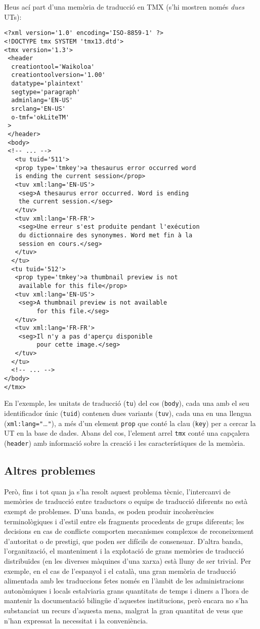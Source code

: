 Heus ací part d'una memòria de traducció en TMX (s'hi mostren només
\emph{dues} UTs):
\begin{verbatim}
<?xml version='1.0' encoding='ISO-8859-1' ?>
<!DOCTYPE tmx SYSTEM 'tmx13.dtd'>
<tmx version='1.3'>
 <header
  creationtool='Waikoloa'
  creationtoolversion='1.00'
  datatype='plaintext'
  segtype='paragraph'
  adminlang='EN-US'
  srclang='EN-US'
  o-tmf='okLiteTM'
 >
 </header>
 <body>
 <!-- ... -->
   <tu tuid='511'>
   <prop type='tmkey'>a thesaurus error occurred word 
   is ending the current session</prop>
   <tuv xml:lang='EN-US'> 
    <seg>A thesaurus error occurred. Word is ending 
    the current session.</seg>
   </tuv>
   <tuv xml:lang='FR-FR'> 
    <seg>Une erreur s'est produite pendant l'exécution 
    du dictionnaire des synonymes. Word met fin à la 
    session en cours.</seg>
   </tuv>
  </tu>
  <tu tuid='512'>
   <prop type='tmkey'>a thumbnail preview is not 
    available for this file</prop>
   <tuv xml:lang='EN-US'>
    <seg>A thumbnail preview is not available 
         for this file.</seg>
   </tuv>
   <tuv xml:lang='FR-FR'>
    <seg>Il n'y a pas d'aperçu disponible 
         pour cette image.</seg>
   </tuv>
  </tu>
  <!-- ... -->
</body>
</tmx>
\end{verbatim}
En l'exemple, les unitats de traducció (\texttt{tu}) del cos
(\texttt{body}), cada una amb el seu identificador únic
(\texttt{tuid}) contenen dues variants (\texttt{tuv}), cada una en una
llengua (\texttt{xml:lang="}\ldots\texttt{"}), a més d'un element
\texttt{prop} que conté la clau (\texttt{key}) per a cercar la UT en
la base de dades. Abans del cos, l'element arrel \texttt{tmx} conté
una capçalera (\texttt{header}) amb informació sobre la creació i les
característiques de la memòria.

\subsection{Altres problemes}

Però, fins i tot quan ja s'ha resolt aquest problema tècnic,
l'intercanvi de memòries de traducció entre traductors o equips de
traducció diferents no està exempt de problemes. D'una banda, es poden
produir incoherències terminològiques i d'estil entre els fragments
procedents de grups diferents; les decisions en cas de conflicte
comporten mecanismes complexos de reconeixement d'autoritat o de
prestigi, que poden ser difícils de consensuar. D'altra banda,
l'organització, el manteniment i la explotació de grans memòries de
traducció distribuïdes (en les diverses màquines d'una xarxa) està
lluny de ser trivial. Per exemple, en el cas de l'espanyol i el català,
una gran memòria de traducció alimentada amb les traduccions fetes
només en l'àmbit de les administracions autonòmiques i locals
estalviaria grans quantitats de temps i diners a l'hora de mantenir la
documentació bilingüe d'aquestes institucions, però encara no s'ha
substanciat un recurs d'aquesta mena, malgrat la gran quantitat de
veus que n'han expressat la necessitat i la conveniència.

